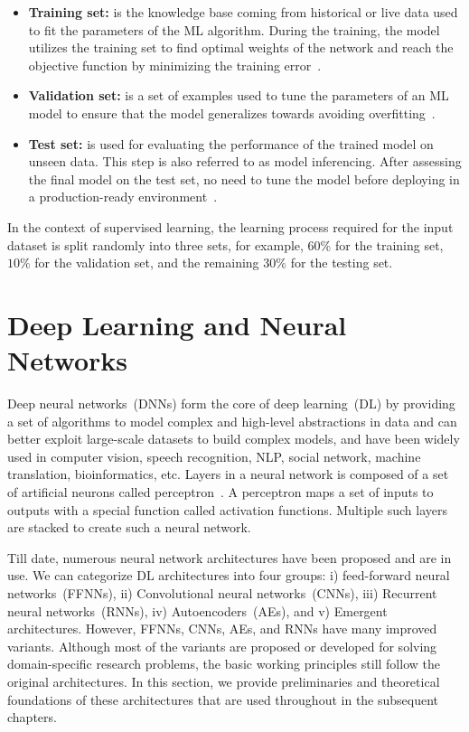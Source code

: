 \vspace{-1mm}
\begin{itemize}[noitemsep]
    \item \textbf{Training set:} is the knowledge base coming from historical or live data used to fit the parameters of the ML algorithm. During the training, the model utilizes the training set to find optimal weights of the network and reach the objective function by minimizing the training error~\cite{karim2018java}. 
    \item \textbf{Validation set:} is a set of examples used to tune the parameters of an ML model to ensure that the model generalizes towards avoiding overfitting~\cite{karim2018java}. 
    \item \textbf{Test set:} is used for evaluating the performance of the trained model on unseen data. This step is also referred to as model inferencing. After assessing the final model on the test set, no need to tune the model before deploying in a production-ready environment~\cite{karim2018java}.
\end{itemize}
\vspace{-1mm}

\hspace*{3.5mm} In the context of supervised learning, the learning process required for the input dataset is split randomly into three sets, for example, $60\%$ for the training set, $10\%$ for the validation set, and the remaining $30\%$ for the testing set.

\section{Deep Learning and Neural Networks}
Deep neural networks~(DNNs) form the core of deep learning~(DL) by providing a set of algorithms to model complex and high-level abstractions in data and can better exploit large-scale datasets to build complex models, and have been widely used in computer vision, speech recognition, NLP, social network, machine translation, bioinformatics, etc. Layers in a neural network is composed of a set of artificial neurons called perceptron~\cite{yuan2019adversarial}. A perceptron maps a set of inputs to outputs with a special function called activation functions. Multiple such layers are stacked to create such a neural network. 

\hspace*{3.5mm} Till date, numerous neural network architectures have been proposed and are in use. We can categorize DL architectures into four groups: i) feed-forward neural networks~(FFNNs), ii) Convolutional neural networks~(CNNs), iii) Recurrent neural networks~(RNNs), iv) Autoencoders~(AEs), and v) Emergent architectures. However, FFNNs, CNNs, AEs, and RNNs have many improved variants. Although most of the variants are proposed or developed for solving domain-specific research problems, the basic working principles still follow the original  architectures. In this section, we provide preliminaries and theoretical foundations of these architectures that are used throughout in the subsequent chapters.  

